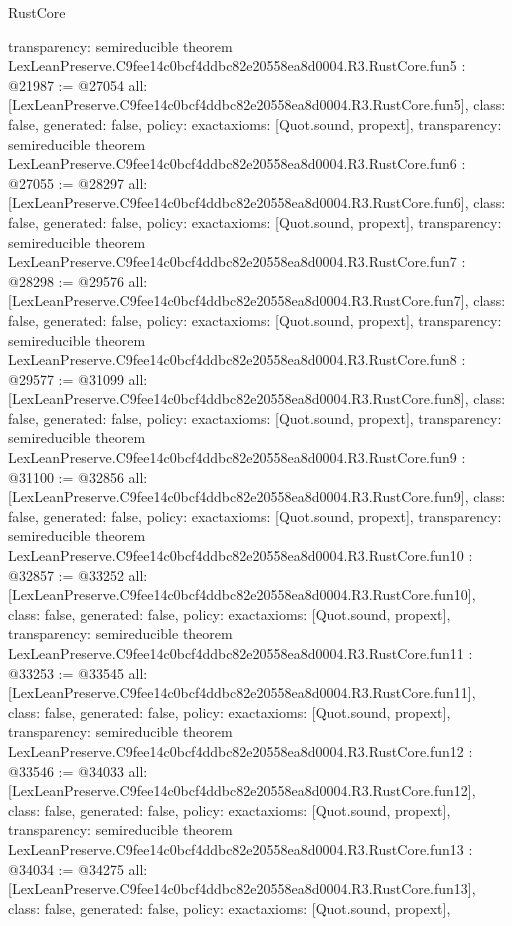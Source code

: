 \begin{lexlean}{RustCore}
\begin{coremodule}
{  transparency: semireducible
}
theorem LexLeanPreserve.C9fee14c0bcf4ddbc82e20558ea8d0004.R3.RustCore.fun5 : @21987 := @27054 {
  all: [LexLeanPreserve.C9fee14c0bcf4ddbc82e20558ea8d0004.R3.RustCore.fun5],
  class: false,
  generated: false,
  policy: exact{axioms: [Quot.sound, propext]},
  transparency: semireducible
}
theorem LexLeanPreserve.C9fee14c0bcf4ddbc82e20558ea8d0004.R3.RustCore.fun6 : @27055 := @28297 {
  all: [LexLeanPreserve.C9fee14c0bcf4ddbc82e20558ea8d0004.R3.RustCore.fun6],
  class: false,
  generated: false,
  policy: exact{axioms: [Quot.sound, propext]},
  transparency: semireducible
}
theorem LexLeanPreserve.C9fee14c0bcf4ddbc82e20558ea8d0004.R3.RustCore.fun7 : @28298 := @29576 {
  all: [LexLeanPreserve.C9fee14c0bcf4ddbc82e20558ea8d0004.R3.RustCore.fun7],
  class: false,
  generated: false,
  policy: exact{axioms: [Quot.sound, propext]},
  transparency: semireducible
}
theorem LexLeanPreserve.C9fee14c0bcf4ddbc82e20558ea8d0004.R3.RustCore.fun8 : @29577 := @31099 {
  all: [LexLeanPreserve.C9fee14c0bcf4ddbc82e20558ea8d0004.R3.RustCore.fun8],
  class: false,
  generated: false,
  policy: exact{axioms: [Quot.sound, propext]},
  transparency: semireducible
}
theorem LexLeanPreserve.C9fee14c0bcf4ddbc82e20558ea8d0004.R3.RustCore.fun9 : @31100 := @32856 {
  all: [LexLeanPreserve.C9fee14c0bcf4ddbc82e20558ea8d0004.R3.RustCore.fun9],
  class: false,
  generated: false,
  policy: exact{axioms: [Quot.sound, propext]},
  transparency: semireducible
}
theorem LexLeanPreserve.C9fee14c0bcf4ddbc82e20558ea8d0004.R3.RustCore.fun10 : @32857 := @33252 {
  all: [LexLeanPreserve.C9fee14c0bcf4ddbc82e20558ea8d0004.R3.RustCore.fun10],
  class: false,
  generated: false,
  policy: exact{axioms: [Quot.sound, propext]},
  transparency: semireducible
}
theorem LexLeanPreserve.C9fee14c0bcf4ddbc82e20558ea8d0004.R3.RustCore.fun11 : @33253 := @33545 {
  all: [LexLeanPreserve.C9fee14c0bcf4ddbc82e20558ea8d0004.R3.RustCore.fun11],
  class: false,
  generated: false,
  policy: exact{axioms: [Quot.sound, propext]},
  transparency: semireducible
}
theorem LexLeanPreserve.C9fee14c0bcf4ddbc82e20558ea8d0004.R3.RustCore.fun12 : @33546 := @34033 {
  all: [LexLeanPreserve.C9fee14c0bcf4ddbc82e20558ea8d0004.R3.RustCore.fun12],
  class: false,
  generated: false,
  policy: exact{axioms: [Quot.sound, propext]},
  transparency: semireducible
}
theorem LexLeanPreserve.C9fee14c0bcf4ddbc82e20558ea8d0004.R3.RustCore.fun13 : @34034 := @34275 {
  all: [LexLeanPreserve.C9fee14c0bcf4ddbc82e20558ea8d0004.R3.RustCore.fun13],
  class: false,
  generated: false,
  policy: exact{axioms: [Quot.sound, propext]},
}
\end{coremodule}
\end{lexlean}

